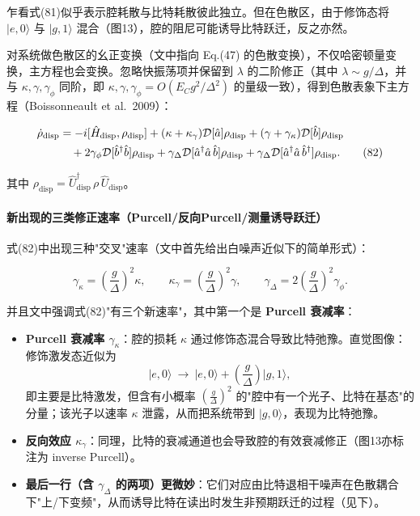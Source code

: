 \documentclass[12pt,a4paper,oneside]{ctexbook}
\let\oldparagraph\paragraph
\renewcommand{\paragraph}[1]{\oldparagraph{#1}\mbox{}}
\begin{document}
乍看式(81)似乎表示腔耗散与比特耗散彼此独立。但在色散区，由于修饰态将 $|e,0\rangle$ 与 $|g,1\rangle$ 混合（图13），腔的阻尼可能诱导比特跃迁，反之亦然。

对系统做色散区的幺正变换（文中指向 Eq.(47) 的色散变换），不仅哈密顿量变换，主方程也会变换。忽略快振荡项并保留到 $\lambda$ 的二阶修正（其中 $\lambda\sim g/\Delta$，并与 $\kappa,\gamma,\gamma_\phi$ 同阶，即 $\kappa,\gamma,\gamma_\phi = O(E_C g^2/\Delta^2)$ 的量级一致），得到色散表象下主方程（Boissonneault et al.\ 2009）：

\begin{align}
\dot\rho_{\mathrm{disp}}
&= -i[\hat H_{\mathrm{disp}},\rho_{\mathrm{disp}}]
+(\kappa+\kappa_\gamma)\mathcal D[\hat a]\rho_{\mathrm{disp}}
+(\gamma+\gamma_\kappa)\mathcal D[\hat b]\rho_{\mathrm{disp}} \notag\\
&\quad +2\gamma_\phi \mathcal D[\hat b^\dagger\hat b]\rho_{\mathrm{disp}}
+\gamma_\Delta \mathcal D[\hat a^\dagger\hat a\,\hat b]\rho_{\mathrm{disp}}
+\gamma_\Delta \mathcal D[\hat a^\dagger\hat a\,\hat b^\dagger]\rho_{\mathrm{disp}} .
\tag{82}
\end{align}

其中 $\rho_{\mathrm{disp}} = \hat U_{\mathrm{disp}}^\dagger\,\rho\,\hat U_{\mathrm{disp}}$。

\paragraph{新出现的三类修正速率（Purcell/反向Purcell/测量诱导跃迁）}

式(82)中出现三种"交叉"速率（文中首先给出白噪声近似下的简单形式）：

\begin{equation}
\gamma_\kappa=\left(\frac{g}{\Delta}\right)^2\kappa,\qquad
\kappa_\gamma=\left(\frac{g}{\Delta}\right)^2\gamma,\qquad
\gamma_\Delta=2\left(\frac{g}{\Delta}\right)^2\gamma_\phi .
\tag{83}
\end{equation}

并且文中强调式(82)"有三个新速率"，其中第一个是 \textbf{Purcell 衰减率}：

\begin{itemize}
  \item \textbf{Purcell 衰减率 $\gamma_\kappa$}：腔的损耗 $\kappa$ 通过修饰态混合导致比特弛豫。直觉图像：修饰激发态近似为
  \begin{equation}
  |e,0\rangle \ \to\ |e,0\rangle + \left(\frac{g}{\Delta}\right)|g,1\rangle,
  \end{equation}
  即主要是比特激发，但含有小概率 $\left(\frac{g}{\Delta}\right)^2$ 的"腔中有一个光子、比特在基态"的分量；该光子以速率 $\kappa$ 泄露，从而把系统带到 $|g,0\rangle$，表现为比特弛豫。
  \item \textbf{反向效应 $\kappa_\gamma$}：同理，比特的衰减通道也会导致腔的有效衰减修正（图13亦标注为 inverse Purcell）。
  \item \textbf{最后一行（含 $\gamma_\Delta$ 的两项）更微妙}：它们对应由比特退相干噪声在色散耦合下"上/下变频"，从而诱导比特在读出时发生非预期跃迁的过程（见下）。
\end{itemize}
\end{document}
